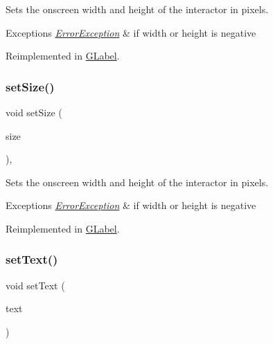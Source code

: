 Sets the onscreen width and height of the interactor in pixels. 


\begin{DoxyExceptions}{Exceptions}
{\em \mbox{\hyperlink{classErrorException}{Error\+Exception}}} & if width or height is negative \\
\hline
\end{DoxyExceptions}


Reimplemented in \mbox{\hyperlink{classGLabel_ae7e6371aa2311d6f18caf8f7be59704d}{G\+Label}}.

\mbox{\label{classGInteractor_ae2b628228f192c2702c4ce941b2af68f}} 
\subsubsection{\texorpdfstring{set\+Size()}{setSize()}\hspace{0.1cm}{\footnotesize\ttfamily [2/2]}}
{\footnotesize\ttfamily void set\+Size (\begin{DoxyParamCaption}\item[{const \mbox{\hyperlink{classGDimension}{G\+Dimension}} \&}]{size }\end{DoxyParamCaption})\hspace{0.3cm}{\ttfamily [virtual]}, {\ttfamily [inherited]}}



Sets the onscreen width and height of the interactor in pixels. 


\begin{DoxyExceptions}{Exceptions}
{\em \mbox{\hyperlink{classErrorException}{Error\+Exception}}} & if width or height is negative \\
\hline
\end{DoxyExceptions}


Reimplemented in \mbox{\hyperlink{classGLabel_a0fe8cce1a80750f36fa14ee99ca34014}{G\+Label}}.

\mbox{\label{classGTextArea_ac1ae51949d41ee9054634be5967d91b8}} 
\subsubsection{\texorpdfstring{set\+Text()}{setText()}}
{\footnotesize\ttfamily void set\+Text (\begin{DoxyParamCaption}\item[{const std\+::string \&}]{text }\end{DoxyParamCaption})\hspace{0.3cm}{\ttfamily [virtual]}}



